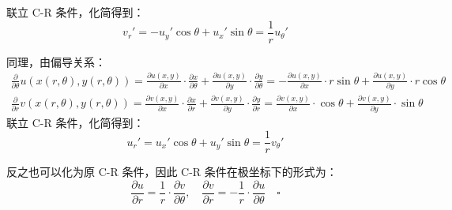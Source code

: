 \documentclass[UTF8]{report}
\theoremstyle{MyLineTheoremStyle} %
\theoremstyle{MyBlockTheoremStyle} %
\theoremstyle{MySubsubsectionStyle} %
\begin{document}
联立 C-R 条件，化简得到：
\begin{equation*}
v_r' = -u_y'\cos \theta + u_x' \sin \theta = \frac{1}{r}u_\theta'
\end{equation*}

同理，由偏导关系：
\begin{gather*}
\frac{\partial  }{\partial \theta }u\left(x(r, \theta),y(r, \theta)\right) 
= \frac{\partial u(x,y) }{\partial x }\cdot\frac{\partial x}{\partial \theta } + \frac{\partial u(x,y) }{\partial y}\cdot\frac{\partial y}{\partial \theta } 
= - \frac{\partial u(x,y) }{\partial x } \cdot r\sin \theta + \frac{\partial u(x,y) }{\partial y}\cdot r \cos \theta 
\\ 
\frac{\partial  }{\partial r }v\left(x(r, \theta),y(r, \theta)\right) 
= \frac{\partial v(x,y) }{\partial x }\cdot\frac{\partial x}{\partial r } + \frac{\partial v(x,y) }{\partial y}\cdot\frac{\partial y}{\partial r } 
= \frac{\partial v(x,y) }{\partial x }\cdot \cos \theta + \frac{\partial v(x,y) }{\partial y}\cdot \sin \theta 
\end{gather*}
联立 C-R 条件，化简得到：
\begin{equation*}
u_r' = u_x'\cos \theta + u_y' \sin \theta = \frac{1}{r}v_\theta'
\end{equation*}

反之也可以化为原 C-R 条件，因此 C-R 条件在极坐标下的形式为：
\begin{equation*}
    \frac{\partial u }{\partial r } = \frac{1}{r}\cdot\frac{\partial v }{\partial \theta }, \quad \frac{\partial v }{\partial r } = -\frac{1}{r}\cdot\frac{\partial u }{\partial \theta }\quad \square
\end{equation*}
\end{document}
